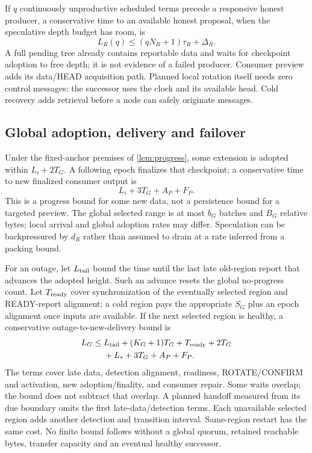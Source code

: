 \documentclass[11pt,a4paper,onecolumn]{article}
\theoremstyle{remark}\newtheorem{example}[definition]{Example}
\begin{document}
If $q$ continuously unproductive scheduled terms precede a responsive honest
producer, a conservative time to an available honest proposal, when the
speculative depth budget has room, is
\[
 L_R(q)\leq(qN_R+1)\tau_R+\Delta_R.
\]
A full pending tree already contains reportable data and waits for checkpoint
adoption to free depth; it is not evidence of a failed producer. Consumer
preview adds its data/HEAD acquisition path. Planned local rotation itself
needs zero control messages: the successor uses the clock and its available
head. Cold recovery adds retrieval before a node can safely originate messages.

\subsection{Global adoption, delivery and failover}\label{sec:recoverybounds}
Under the fixed-anchor premises of \cref{lem:progress}, some extension is
adopted within $L_i+2T_G$. A following epoch finalizes that checkpoint; a
conservative time to new finalized consumer output is
\[
 L_i+3T_G+A_P+F_P.
\]
This is a progress bound for some new data, not a persistence bound for a
targeted preview. The global selected range is at most $b_G$ batches and
$B_G$ relative bytes; local arrival and global adoption rates may differ.
Speculation can be backpressured by $d_R$ rather than assumed to drain at a
rate inferred from a packing bound.

For an outage, let $L_{\rm tail}$ bound the time until the last late
old-region report that advances the adopted height. Such an advance resets
the global no-progress count. Let $T_{\rm ready}$ cover synchronization of the
eventually selected region and READY-report alignment; a cold region pays
the appropriate $S_G$ plus an epoch alignment once inputs are available.
If the next selected region is healthy, a conservative outage-to-new-delivery
bound is
\begin{equation}\label{eq:georecover}
\begin{split}
 L_G\leq{}&L_{\rm tail}+(K_G+1)T_G+T_{\rm ready}+2T_G\\
          &{}+L_*+3T_G+A_P+F_P.
\end{split}
\end{equation}
The terms cover late data, detection alignment, readiness, ROTATE/CONFIRM and
activation, new adoption/finality, and consumer repair. Some waits overlap;
the bound does not subtract that overlap. A planned handoff measured from
its due boundary omits the first late-data/detection terms. Each unavailable
selected region adds another detection and transition interval. Same-region
restart has the same cost. No finite bound follows without a global quorum,
retained reachable bytes, transfer capacity and an eventual healthy successor.
\end{document}
